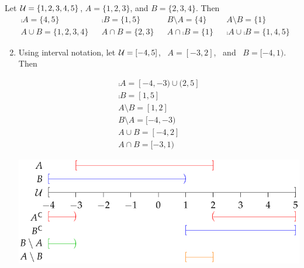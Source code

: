 \begin{examples}{}{}
	\exstart Let $\mathcal{U}=\{1,2,3,4,5\}$, $A=\{1,2,3\}$, and $B=\{2,3,4\}$. Then
	\begin{align*}
		&\comp A=\{4,5\} &&\comp B=\{1,5\} &&B\setminus A=\{4\} &&A\setminus B=\{1\}\\
		&A\cup B=\{1,2,3,4\} &&A\cap B=\{2,3\} &&A\cap\comp B=\{1\} &&\comp A\cup\comp B=\{1,4,5\}
	\end{align*}
	
	\goodbreak
		
	\begin{enumerate}\setcounter{enumi}{1}
		\item Using interval notation, let $\mathcal{U}=[-4,5]$, \ $A=[-3,2]$, \ and \ $B=[-4,1)$. Then\par
		\begin{minipage}[t]{0.3\linewidth}\vspace{-13pt}
			\begin{gather*}
			\comp A=[-4,-3)\cup (2,5]\\
			\comp B=[1,5]\\
			A\setminus B=[1,2]\\
			B\setminus A=[-4,-3)\\
			A\cup B=[-4,2]\\
			A\cap B=[-3,1) 
			\end{gather*}
		\end{minipage}
		\hfill
		\begin{minipage}[t]{0.69\linewidth}\vspace{0pt}
			\flushright\includegraphics[scale=0.8]{sets-13-intervalex}

\end{minipage}
\end{enumerate}
\end{examples}
